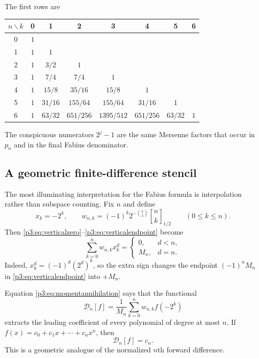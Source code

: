 \documentclass[11pt,oneside]{article}
\theoremstyle{definition}
\theoremstyle{remark}
\newcommand{\halfqbinom}[2]{{\genfrac{[}{]}{0pt}{}{#1}{#2}}_{1/2}}
\begin{document}
The first rows are
\begin{center}
\begin{tabular}{@{}c*{7}{c}@{}}
\toprule
$n\backslash k$&0&1&2&3&4&5&6\\
\midrule
0&$1$\\
1&$1$&$1$\\
2&$1$&$3/2$&$1$\\
3&$1$&$7/4$&$7/4$&$1$\\
4&$1$&$15/8$&$35/16$&$15/8$&$1$\\
5&$1$&$31/16$&$155/64$&$155/64$&$31/16$&$1$\\
6&$1$&$63/32$&$651/256$&$1395/512$&$651/256$&$63/32$&$1$\\
\bottomrule
\end{tabular}
\end{center}
The conspicuous numerators $2^j-1$ are the same Mersenne factors that occur in $p_n$ and in the final Fabius denominator.

\subsection{A geometric finite-difference stencil}

The most illuminating interpretation for the Fabius formula is interpolation rather than subspace counting.  Fix $n$ and define
\begin{equation}\label{p3:eq:nodesweights}
 x_k=-2^k,
 \qquad
 w_{n,k}=(-1)^k2^{-\binom{k}{2}}\halfqbinom{n}{k}
 \qquad(0\le k\le n).
\end{equation}
Then \eqref{p3:eq:verticalzero}--\eqref{p3:eq:verticalendpoint} become
\begin{equation}\label{p3:eq:momentannihilation}
 \sum_{k=0}^{n}w_{n,k}x_k^d=
 \begin{cases}
 0,&d<n,\\
 M_n,&d=n.
 \end{cases}
\end{equation}
Indeed, $x_k^d=(-1)^d(2^d)^k$, so the extra sign changes the endpoint $(-1)^nM_n$ in \eqref{p3:eq:verticalendpoint} into $+M_n$.

Equation \eqref{p3:eq:momentannihilation} says that the functional
\begin{equation}\label{p3:eq:Dndef}
 \mathcal D_n[f]=\frac1{M_n}\sum_{k=0}^{n}w_{n,k}f(-2^k)
\end{equation}
extracts the leading coefficient of every polynomial of degree at most $n$.  If
$f(x)=c_0+c_1x+\cdots+c_nx^n$, then
\[
 \mathcal D_n[f]=c_n.
\]
This is a geometric analogue of the normalized $n$th forward difference.
\end{document}
